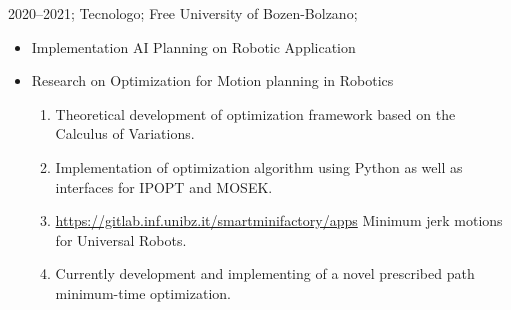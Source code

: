{%
    2020--2021;%
    Tecnologo;%
    Free University of Bozen-Bolzano;%
    \begin{itemize}
        \item Implementation AI Planning on Robotic Application
        \item Research on Optimization for Motion planning in Robotics
            \ifdefined\extended
                \begin{enumerate}
                    \item Theoretical development of optimization framework based on the Calculus of Variations.
                    \item Implementation of optimization algorithm using Python as well as interfaces for IPOPT and MOSEK.
                    \item \href{https://gitlab.inf.unibz.it/smartminifactory/apps}{https://gitlab.inf.unibz.it/smartminifactory/apps} Minimum jerk motions for Universal Robots.
                    \item Currently development and implementing of a novel prescribed path minimum-time optimization.
                \end{enumerate}
            \fi
    \end{itemize}
}%
%
